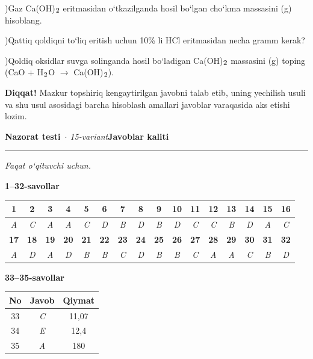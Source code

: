 \documentclass[11pt,a4paper]{article}
\renewcommand{\textsubscript}[1]{\ensuremath{_{\text{\fontsize{8}{8}\selectfont #1}}}}
\newcommand{\diqqat}[1]{\par\smallskip\noindent\textbf{Diqqat!} #1\par\medskip}
\begin{document}
)Gaz Ca(OH)\textsubscript{2} eritmasidan o`tkazilganda hosil bo`lgan cho`kma massasini (g) hisoblang.\par
{})Qattiq qoldiqni to`liq eritish uchun 10\% li HCl eritmasidan necha gramm kerak?\par
{})Qoldiq oksidlar suvga solinganda hosil bo`ladigan Ca(OH)\textsubscript{2} massasini (g) toping (CaO + H\textsubscript{2}O $\to$ Ca(OH)\textsubscript{2}).\par
\diqqat{Mazkur topshiriq kengaytirilgan javobni talab etib, uning yechilish usuli va shu usul asosidagi barcha hisoblash amallari javoblar varaqasida aks etishi lozim.}
\newpage
\noindent\textbf{\fontsize{13}{15}\selectfont Nazorat testi}\ \textit{$\cdot$ 15-variant}\hfill \textbf{Javoblar kaliti}\par\smallskip\hrule\smallskip
\textit{Faqat o`qituvchi uchun.}\par\medskip
\noindent\textbf{1--32-savollar}\par\smallskip
\noindent\begin{tabular}{|c|c|c|c|c|c|c|c|c|c|c|c|c|c|c|c|}\hline
\textbf{1} & \textbf{2} & \textbf{3} & \textbf{4} & \textbf{5} & \textbf{6} & \textbf{7} & \textbf{8} & \textbf{9} & \textbf{10} & \textbf{11} & \textbf{12} & \textbf{13} & \textbf{14} & \textbf{15} & \textbf{16}\\\hline
\textsl{A} & \textsl{C} & \textsl{A} & \textsl{A} & \textsl{C} & \textsl{D} & \textsl{B} & \textsl{D} & \textsl{B} & \textsl{D} & \textsl{C} & \textsl{C} & \textsl{B} & \textsl{D} & \textsl{A} & \textsl{C}\\\hline
\textbf{17} & \textbf{18} & \textbf{19} & \textbf{20} & \textbf{21} & \textbf{22} & \textbf{23} & \textbf{24} & \textbf{25} & \textbf{26} & \textbf{27} & \textbf{28} & \textbf{29} & \textbf{30} & \textbf{31} & \textbf{32}\\\hline
\textsl{A} & \textsl{D} & \textsl{A} & \textsl{D} & \textsl{B} & \textsl{B} & \textsl{C} & \textsl{D} & \textsl{B} & \textsl{B} & \textsl{C} & \textsl{A} & \textsl{A} & \textsl{C} & \textsl{B} & \textsl{D}\\\hline
\end{tabular}\par\medskip
\noindent\textbf{33--35-savollar}\par\smallskip
\noindent\begin{tabular}{|c|c|c|}\hline \textbf{No} & \textbf{Javob} & \textbf{Qiymat}\\\hline
33 & \textsl{C} & 11,07\\\hline
34 & \textsl{E} & 12,4\\\hline
35 & \textsl{A} & 180\\\hline
\end{tabular}\par\medskip
\end{document}
